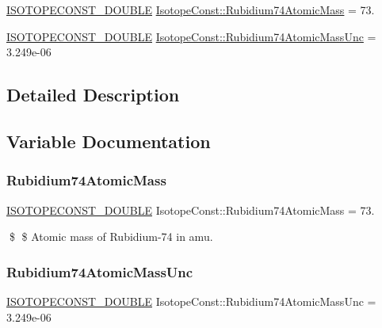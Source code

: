 \begin{DoxyCompactItemize}
\item 
\mbox{\hyperlink{group___isotope_const-_macros_ga8f45a7272ce02c0b4c65c44636ed719a}{I\+S\+O\+T\+O\+P\+E\+C\+O\+N\+S\+T\+\_\+\+D\+O\+U\+B\+LE}} \mbox{\hyperlink{group___isotope_const-_rubidium-_rb74_ga1bbb37f0cd4ca3fb76284a162a8bf442}{Isotope\+Const\+::\+Rubidium74\+Atomic\+Mass}} = 73.
\item 
\mbox{\hyperlink{group___isotope_const-_macros_ga8f45a7272ce02c0b4c65c44636ed719a}{I\+S\+O\+T\+O\+P\+E\+C\+O\+N\+S\+T\+\_\+\+D\+O\+U\+B\+LE}} \mbox{\hyperlink{group___isotope_const-_rubidium-_rb74_ga8a1dd6d3251cd5c98425b1330a1ed0b8}{Isotope\+Const\+::\+Rubidium74\+Atomic\+Mass\+Unc}} = 3.\+249e-\/06
\end{DoxyCompactItemize}


\subsection{Detailed Description}


\subsection{Variable Documentation}
\mbox{\label{group___isotope_const-_rubidium-_rb74_ga1bbb37f0cd4ca3fb76284a162a8bf442}} 
\subsubsection{\texorpdfstring{Rubidium74\+Atomic\+Mass}{Rubidium74AtomicMass}}
{\footnotesize\ttfamily \mbox{\hyperlink{group___isotope_const-_macros_ga8f45a7272ce02c0b4c65c44636ed719a}{I\+S\+O\+T\+O\+P\+E\+C\+O\+N\+S\+T\+\_\+\+D\+O\+U\+B\+LE}} Isotope\+Const\+::\+Rubidium74\+Atomic\+Mass = 73.}

\$ \$ Atomic mass of Rubidium-\/74 in amu. \mbox{\label{group___isotope_const-_rubidium-_rb74_ga8a1dd6d3251cd5c98425b1330a1ed0b8}} 
\subsubsection{\texorpdfstring{Rubidium74\+Atomic\+Mass\+Unc}{Rubidium74AtomicMassUnc}}
{\footnotesize\ttfamily \mbox{\hyperlink{group___isotope_const-_macros_ga8f45a7272ce02c0b4c65c44636ed719a}{I\+S\+O\+T\+O\+P\+E\+C\+O\+N\+S\+T\+\_\+\+D\+O\+U\+B\+LE}} Isotope\+Const\+::\+Rubidium74\+Atomic\+Mass\+Unc = 3.\+249e-\/06}

